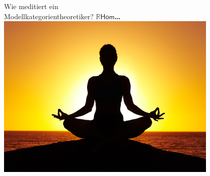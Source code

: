 \documentclass[a4paper,ngerman,landscape,30pt]{scrartcl}
\begin{document}
\begin{center}
  \huge\sffamily
  Wie meditiert ein \\ Modellkategorientheoretiker?
  \textbf{\phantom{\ldots}$\mathbb{R}\boldsymbol{\mathsf{Hom}}$\ldots}
  \vfill
  \includegraphics[scale=0.7]{images/meditation}
\end{center}
\newpage

\end{document}
